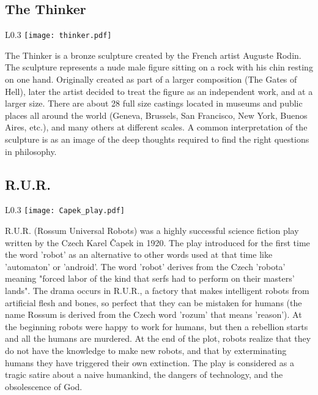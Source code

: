 \subsection* {The Thinker}

\begin{wrapfigure}{L}{0.3\textwidth}
\centering
\texttt{[image: thinker.pdf]}
\end{wrapfigure}

The Thinker is a bronze sculpture created by the French artist Auguste Rodin. The sculpture represents a nude male figure sitting on a rock with his chin resting on one hand. Originally created as part of a larger composition (The Gates of Hell), later the artist decided to treat the figure as an independent work, and at a larger size. There are about 28 full size castings located in museums and public places all around the world (Geneva, Brussels, San Francisco, New York, Buenos Aires, etc.), and many others at different scales. A common interpretation of the sculpture is as an image of the deep thoughts required to find the right questions in philosophy.

\subsection* {R.U.R.}

\begin{wrapfigure}{L}{0.3\textwidth}
\centering
\texttt{[image: Capek\_play.pdf]}
\end{wrapfigure}

R.U.R. (Rossum Universal Robots) was a highly successful science fiction play written by the Czech Karel Čapek in 1920. The play introduced for the first time the word 'robot' as an alternative to other words used at that time like 'automaton' or 'android'. The word 'robot' derives from the Czech 'robota' meaning "forced labor of the kind that serfs had to perform on their masters' lands". The drama occurs in R.U.R., a factory that makes intelligent robots from artificial flesh and bones, so perfect that they can be mistaken for humans (the name Rossum is derived from the Czech word 'rozum' that means 'reason'). At the beginning robots were happy to work for humans, but then a rebellion starts and all the humans are murdered. At the end of the plot, robots realize that they do not have the knowledge to make new robots, and that by exterminating humans they have triggered their own extinction. The play is considered as a tragic satire about a naive humankind, the dangers of technology, and the obsolescence of God.

